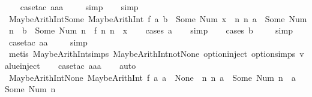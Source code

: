 \begin{isabellebody}
\ \ \isamarkupfalse%
\ {\isacharparenleft}case{\isacharunderscore}tac\ aaa{\isacharparenright}\isanewline
\ \ \ \isamarkupfalse%
\ simp\isanewline
\ \ \isamarkupfalse%
\ simp%
\endisatagproof
{\isafoldproof}%
%
\isadelimproof
\isanewline
%
\endisadelimproof
\isanewline
{}\isamarkupfalse%
\ MaybeArithInt{\isacharunderscore}Some{\isacharcolon}\ {\isachardoublequoteopen}MaybeArithInt\ f\ a\ b\ {\isacharequal}\ Some\ {\isacharparenleft}Num\ x{\isacharparenright}\ {\isacharequal}\ {\isacharparenleft}{\isasymexists}n\ n{\isacharprime}{\isachardot}\ a\ {\isacharequal}\ Some\ {\isacharparenleft}Num\ n{\isacharparenright}\ {\isasymand}\ b\ {\isacharequal}\ Some\ {\isacharparenleft}Num\ n{\isacharprime}{\isacharparenright}\ {\isasymand}\ f\ n\ n{\isacharprime}\ {\isacharequal}\ x{\isacharparenright}{\isachardoublequoteclose}\isanewline
%
\isadelimproof
\ \ %
\endisadelimproof
%
\isatagproof
{}\isamarkupfalse%
\ {\isacharparenleft}cases\ a{\isacharparenright}\isanewline
\ \ \isamarkupfalse%
\ simp\isanewline
\ \ \isamarkupfalse%
\ {\isacharparenleft}cases\ b{\isacharparenright}\isanewline
\ \ \ \isamarkupfalse%
\ simp\isanewline
\ \ \isamarkupfalse%
\ {\isacharparenleft}case{\isacharunderscore}tac\ aa{\isacharparenright}\isanewline
\ \ \ \isamarkupfalse%
\ simp\isanewline
\ \ \ \isamarkupfalse%
\ {\isacharparenleft}metis\ MaybeArithInt{\isachardot}simps{\isacharparenleft}{}{\isacharparenright}\ MaybeArithInt{\isacharunderscore}not{\isacharunderscore}None\ option{\isachardot}inject\ option{\isachardot}simps{\isacharparenleft}{}{\isacharparenright}\ value{\isachardot}inject{\isacharparenleft}{}{\isacharparenright}{\isacharparenright}\isanewline
\ \ \isamarkupfalse%
\ {\isacharparenleft}case{\isacharunderscore}tac\ aaa{\isacharparenright}\isanewline
\ \ \isamarkupfalse%
\ auto%
\endisatagproof
{\isafoldproof}%
%
\isadelimproof
\isanewline
%
\endisadelimproof
\isanewline
{}\isamarkupfalse%
\ MaybeArithInt{\isacharunderscore}None{\isacharcolon}\ {\isachardoublequoteopen}{\isacharparenleft}MaybeArithInt\ f\ a{}\ a{}\ {\isacharequal}\ None{\isacharparenright}\ {\isacharequal}\ {\isacharparenleft}{\isasymnexists}n\ n{\isacharprime}{\isachardot}\ a{}\ {\isacharequal}\ Some\ {\isacharparenleft}Num\ n{\isacharparenright}\ {\isasymand}\ a{}\ {\isacharequal}\ Some\ {\isacharparenleft}Num\ n{\isacharprime}{\isacharparenright}{\isacharparenright}{\isachardoublequoteclose}\isanewline

\end{isabellebody}
